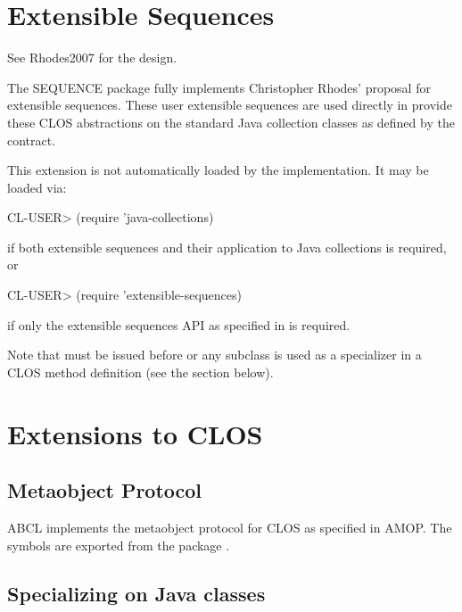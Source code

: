 \documentclass[10pt]{book}
\begin{document}
         
\section{Extensible Sequences}

See Rhodes2007 \cite{RHODES2007} for the design.

The SEQUENCE package fully implements Christopher Rhodes' proposal for
extensible sequences.  These user extensible sequences are used
directly in  provide these CLOS
abstractions on the standard Java collection classes as defined by the
 contract.


This extension is not automatically loaded by the implementation.   It
may be loaded via:

\begin{listing-lisp}
CL-USER> (require 'java-collections)
\end{listing-lisp}

if both extensible sequences and their application to Java collections
is required, or

\begin{listing-lisp}
CL-USER> (require 'extensible-sequences)
\end{listing-lisp}

if only the extensible sequences API as specified in \cite{RHODES2007} is
required.

Note that  must be issued before
 or any subclass is used as a specializer in a CLOS
method definition (see the section below).

\section{Extensions to CLOS}

\subsection{Metaobject Protocol}

ABCL implements the metaobject protocol for CLOS as specified in AMOP.
The symbols are exported from the package .

\subsection{Specializing on Java classes}
\end{document}
